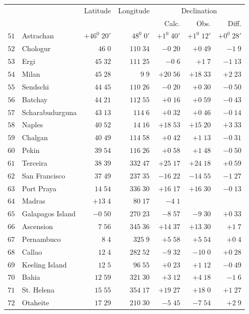 \clearpage
{}
\begingroup
\fontsize{9}{10.2}\selectfont
\setlength{\tabcolsep}{2.5pt}
\renewcommand{\arraystretch}{1.02}
\begin{center}
\begin{tabular}{rl|r|r||r|r|r}
\hline
&&Latitude&Longitude&\multicolumn{3}{c}{Declination}\\
&&&&Calc.&Obs.&Diff.\\\hline
$51$&Astrachan&$+46^0\;20'$&$48^0\;0'$&$+1^0\;40'$&$+1^0\;12'$&$+0^0\;28'$\\
$52$&Chologur&$46\;0$&$110\;34$&$-0\;20$&$+0\;49$&$-1\;9$\\
$53$&Ergi&$45\;32$&$111\;25$&$-0\;6$&$+1\;7$&$-1\;13$\\
$54$&Milan&$45\;28$&$9\;9$&$+20\;56$&$+18\;33$&$+2\;23$\\
$55$&Sendschi&$44\;45$&$110\;26$&$-0\;20$&$+0\;30$&$-0\;50$\\
$56$&Batchay&$44\;21$&$112\;55$&$+0\;16$&$+0\;59$&$-0\;43$\\
$57$&Scharabudurguna&$43\;13$&$114\;6$&$+0\;32$&$+0\;46$&$-0\;14$\\
$58$&Naples&$40\;52$&$14\;16$&$+18\;53$&$+15\;20$&$+3\;33$\\
$59$&Chalgan&$40\;49$&$114\;58$&$+0\;42$&$+1\;13$&$-0\;31$\\
$60$&Pekin&$39\;54$&$116\;26$&$+0\;58$&$+1\;48$&$-0\;50$\\[2pt]
$61$&Terceira&$38\;39$&$332\;47$&$+25\;17$&$+24\;18$&$+0\;59$\\
$62$&San Francisco&$37\;49$&$237\;35$&$-16\;22$&$-14\;55$&$-1\;27$\\
$63$&Port Praya&$14\;54$&$336\;30$&$+16\;17$&$+16\;30$&$-0\;13$\\
$64$&Madras&$+13\;4$&$80\;17$&$-4\;1$&&\\
$65$&Galapagos Island&$-0\;50$&$270\;23$&$-8\;57$&$-9\;30$&$+0\;33$\\
$66$&Ascension&$7\;56$&$345\;36$&$+14\;37$&$+13\;30$&$+1\;7$\\
$67$&Pernambuco&$8\;4$&$325\;9$&$+5\;58$&$+5\;54$&$+0\;4$\\
$68$&Callao&$12\;4$&$282\;52$&$-9\;32$&$-10\;0$&$+0\;28$\\
$69$&Keeling Island&$12\;5$&$96\;55$&$+0\;23$&$+1\;12$&$-0\;49$\\
$70$&Bahia&$12\;59$&$321\;30$&$+3\;12$&$+4\;18$&$-1\;6$\\[2pt]
$71$&St. Helena&$15\;55$&$354\;17$&$+19\;27$&$+18\;0$&$+1\;27$\\
$72$&Otaheite&$17\;29$&$210\;30$&$-5\;45$&$-7\;54$&$+2\;9$\\

\end{tabular}
\end{center}
